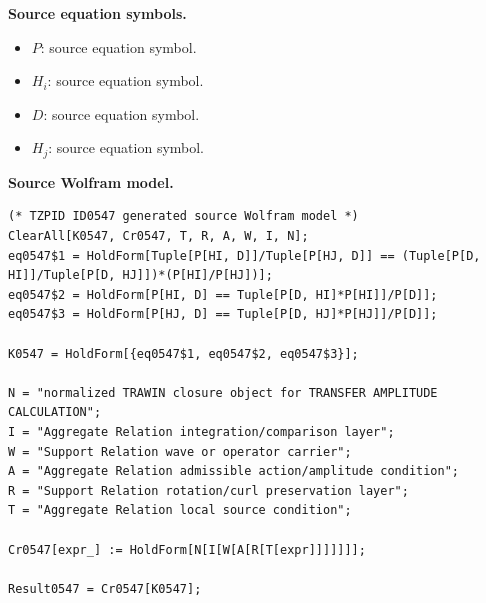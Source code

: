 \begin{minipage}[t]{0.49\linewidth}
\begingroup
\small
\raggedright
\textbf{Source equation symbols.}\par
\begin{itemize}[leftmargin=1.35em,itemsep=1pt,topsep=1pt,parsep=0pt]
    \item $P$: source equation symbol.
    \item $H_i$: source equation symbol.
    \item $D$: source equation symbol.
    \item $H_j$: source equation symbol.
\end{itemize}
\endgroup
\end{minipage}\hfill
\begin{minipage}[t]{0.47\linewidth}
\begingroup
\scriptsize
\raggedright
\textbf{Source Wolfram model.}\par
\begin{Verbatim}[fontsize=\tiny,breaklines=true,breakanywhere=true]
(* TZPID ID0547 generated source Wolfram model *)
ClearAll[K0547, Cr0547, T, R, A, W, I, N];
eq0547$1 = HoldForm[Tuple[P[HI, D]]/Tuple[P[HJ, D]] == (Tuple[P[D, HI]]/Tuple[P[D, HJ]])*(P[HI]/P[HJ])];
eq0547$2 = HoldForm[P[HI, D] == Tuple[P[D, HI]*P[HI]]/P[D]];
eq0547$3 = HoldForm[P[HJ, D] == Tuple[P[D, HJ]*P[HJ]]/P[D]];

K0547 = HoldForm[{eq0547$1, eq0547$2, eq0547$3}];

N = "normalized TRAWIN closure object for TRANSFER AMPLITUDE CALCULATION";
I = "Aggregate Relation integration/comparison layer";
W = "Support Relation wave or operator carrier";
A = "Aggregate Relation admissible action/amplitude condition";
R = "Support Relation rotation/curl preservation layer";
T = "Aggregate Relation local source condition";

Cr0547[expr_] := HoldForm[N[I[W[A[R[T[expr]]]]]]];

Result0547 = Cr0547[K0547];
\end{Verbatim}
\endgroup
\end{minipage}

